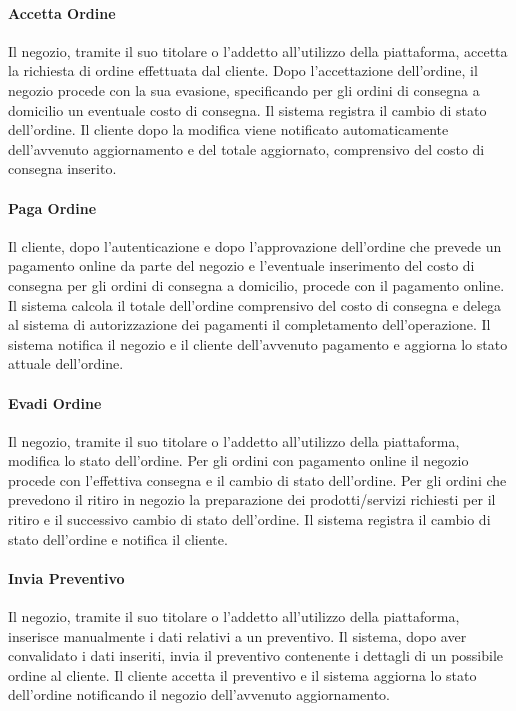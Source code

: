 \paragraph{Accetta Ordine} Il negozio, tramite il suo titolare o l'addetto all'utilizzo della piattaforma, accetta la richiesta di ordine effettuata dal cliente. Dopo l'accettazione dell'ordine, il negozio procede con la sua evasione, specificando per gli ordini di consegna a domicilio un eventuale costo di consegna. Il sistema registra il cambio di stato dell'ordine. Il cliente dopo la modifica viene notificato automaticamente dell'avvenuto aggiornamento e del totale aggiornato, comprensivo del costo di consegna inserito.
\paragraph{Paga Ordine} Il cliente, dopo l'autenticazione e dopo l'approvazione dell'ordine che prevede un pagamento online da parte del negozio e l'eventuale inserimento del costo di consegna per gli ordini di consegna a domicilio, procede con il pagamento online. Il sistema calcola il totale dell'ordine comprensivo del costo di consegna e delega al sistema di autorizzazione dei pagamenti il completamento dell'operazione. Il sistema notifica il negozio e il cliente dell'avvenuto pagamento e aggiorna lo stato attuale dell'ordine.
\paragraph{Evadi Ordine} Il negozio, tramite il suo titolare o l'addetto all'utilizzo della piattaforma, modifica lo stato dell'ordine. Per gli ordini con pagamento online il negozio procede con l'effettiva consegna e il cambio di stato dell'ordine. Per gli ordini che prevedono il ritiro in negozio la preparazione dei prodotti/servizi richiesti per il ritiro e il successivo cambio di stato dell'ordine. Il sistema registra il cambio di stato dell'ordine e notifica il cliente.
\paragraph{Invia Preventivo} Il negozio, tramite il suo titolare o l'addetto all'utilizzo della piattaforma, inserisce manualmente i dati relativi a un preventivo. Il sistema, dopo aver convalidato i dati inseriti, invia il preventivo contenente i dettagli di un possibile ordine al cliente. Il cliente accetta il preventivo e il sistema aggiorna lo stato dell'ordine notificando il negozio dell'avvenuto aggiornamento.
